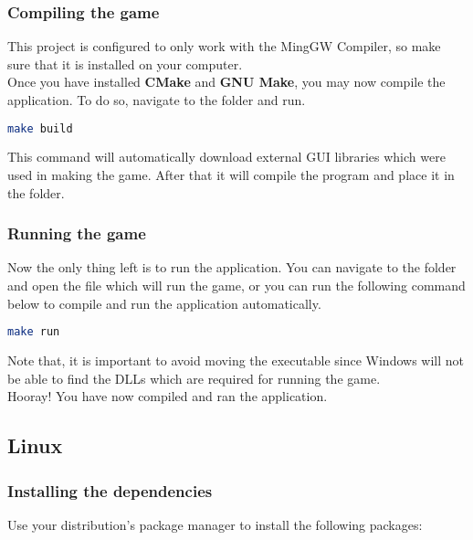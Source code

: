 \subsubsection{Compiling the game}

This project is configured to only work with
the MingGW Compiler, so make sure that it is installed on your computer.\\

Once you have installed \textbf{CMake} and \textbf{GNU Make}, you may now
compile the application. To do so, navigate to the 
folder and run.
 
\begin{lstlisting}[language=bash]
make build
\end{lstlisting}

This command will automatically download external GUI libraries which were used
in making the game. After that it will compile the program and place it in the
 folder.

\subsubsection{Running the game}

Now the only thing left is to run the application. You can navigate to the 
folder and open the  file which will run the game, or you
can run the following command below to compile and run the application automatically.

\begin{lstlisting}[language=bash]
make run
\end{lstlisting}

Note that, it is important to avoid moving the executable since Windows will not
be able to find the DLLs which are required for running the game.\\

Hooray! You have now compiled and ran the application.

\subsection{Linux}

\subsubsection{Installing the dependencies}

Use your distribution’s package manager to install the following packages:

